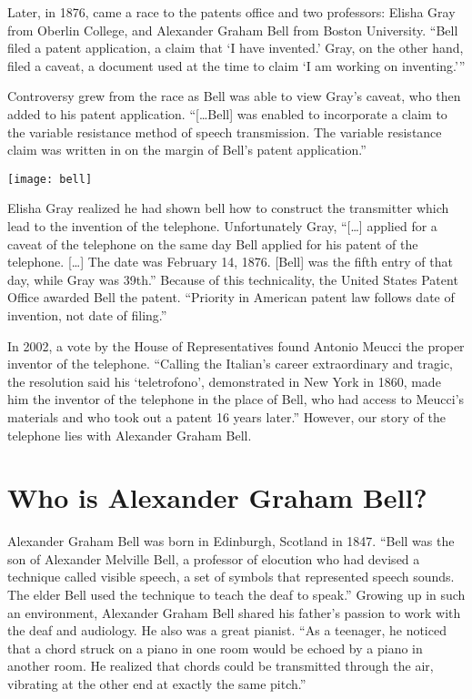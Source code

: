 \documentclass[12pt singlecol]{article}
\newenvironment{Figure}
  {\par\medskip\noindent\minipage{\linewidth}}
  {\endminipage\par\medskip}
\begin{document}
\begin{flushleft}
\begin{multicols}{2}
Later, in 1876, came a race to the patents office and two professors: Elisha Gray from Oberlin College, and Alexander Graham Bell from Boston University. ``Bell filed a patent application, a claim that `I have invented.' Gray, on the other hand, filed a caveat, a document used at the time to claim `I am working on inventing.'''\cite[para.~11]{ATT13} 

Controversy grew from the race as Bell was able to view Gray's caveat, who then added to his patent application. ``[\ldots Bell] was enabled to incorporate a claim to the variable resistance method of speech transmission. The variable resistance claim was written in on the margin of Bell's patent application.''\cite[p.~5]{Coe95}

\begin{Figure}
	\centering
	\texttt{[image: bell]}
	\label{fig:bell}
\end{Figure}

Elisha Gray realized he had shown bell how to construct the transmitter which lead to the invention of the telephone. \cite[p.~5]{Coe95} Unfortunately Gray, ``[\ldots] applied for a caveat of the telephone on the same day Bell applied for his patent of the telephone. [\ldots] The date was February 14, 1876. [Bell] was the fifth entry of that day, while Gray was 39th.'' \cite[para.~4]{LOC12} Because of this technicality, the United States Patent Office awarded Bell the patent. ``Priority in American patent law follows date of invention, not date of filing.''\cite[para.~11]{ATT13}

In 2002, a vote by the House of Representatives found Antonio Meucci the proper inventor of the telephone. ``Calling the Italian's career extraordinary and tragic, the resolution said his `teletrofono', demonstrated in New York in 1860, made him the inventor of the telephone in the place of Bell, who had access to Meucci's materials and who took out a patent 16 years later.''\cite[para.~3]{Carroll02} However, our story of the telephone lies with Alexander Graham Bell.

\section{Who is Alexander Graham Bell?}

Alexander Graham Bell was born in Edinburgh, Scotland in 1847. \cite[para.~1]{MIT00} ``Bell was the son of Alexander Melville Bell, a professor of elocution who had devised a technique called visible speech, a set of symbols that represented speech sounds. The elder Bell used the technique to teach the deaf to speak.'' \cite[para.~3]{ATT13} Growing up in such an environment, Alexander Graham Bell shared his father's passion to work with the deaf and audiology. He also was a great pianist. ``As a teenager, he noticed that a chord struck on a piano in one room would be echoed by a piano in another room. He realized that chords could be transmitted through the air, vibrating at the other end at exactly the same pitch.'' \cite[para.~3]{MIT00} 


\end{multicols}
\end{flushleft}
\end{document}
